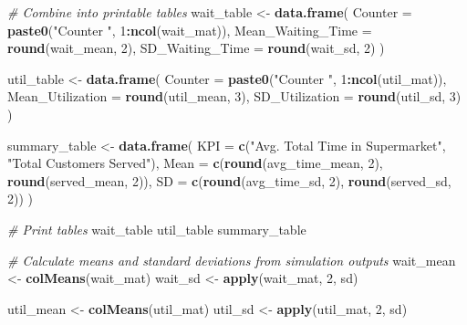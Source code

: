 \documentclass[
]{article}
\newenvironment{Shaded}{\begin{snugshade}}{\end{snugshade}}
\newcommand{\AttributeTok}[1]{\textcolor[rgb]{0.13,0.29,0.53}{#1}}
\newcommand{\CommentTok}[1]{\textcolor[rgb]{0.56,0.35,0.01}{\textit{#1}}}
\newcommand{\DecValTok}[1]{\textcolor[rgb]{0.00,0.00,0.81}{#1}}
\newcommand{\FunctionTok}[1]{\textcolor[rgb]{0.13,0.29,0.53}{\textbf{#1}}}
\newcommand{\NormalTok}[1]{#1}
\newcommand{\OtherTok}[1]{\textcolor[rgb]{0.56,0.35,0.01}{#1}}
\newcommand{\SpecialCharTok}[1]{\textcolor[rgb]{0.81,0.36,0.00}{\textbf{#1}}}
\newcommand{\StringTok}[1]{\textcolor[rgb]{0.31,0.60,0.02}{#1}}
\begin{document}
\begin{Shaded}
\begin{Highlighting}[]
\CommentTok{\# Combine into printable tables}
\NormalTok{wait\_table }\OtherTok{\textless{}{-}} \FunctionTok{data.frame}\NormalTok{(}
  \AttributeTok{Counter =} \FunctionTok{paste0}\NormalTok{(}\StringTok{"Counter "}\NormalTok{, }\DecValTok{1}\SpecialCharTok{:}\FunctionTok{ncol}\NormalTok{(wait\_mat)),}
  \AttributeTok{Mean\_Waiting\_Time =} \FunctionTok{round}\NormalTok{(wait\_mean, }\DecValTok{2}\NormalTok{),}
  \AttributeTok{SD\_Waiting\_Time =} \FunctionTok{round}\NormalTok{(wait\_sd, }\DecValTok{2}\NormalTok{)}
\NormalTok{)}

\NormalTok{util\_table }\OtherTok{\textless{}{-}} \FunctionTok{data.frame}\NormalTok{(}
  \AttributeTok{Counter =} \FunctionTok{paste0}\NormalTok{(}\StringTok{"Counter "}\NormalTok{, }\DecValTok{1}\SpecialCharTok{:}\FunctionTok{ncol}\NormalTok{(util\_mat)),}
  \AttributeTok{Mean\_Utilization =} \FunctionTok{round}\NormalTok{(util\_mean, }\DecValTok{3}\NormalTok{),}
  \AttributeTok{SD\_Utilization =} \FunctionTok{round}\NormalTok{(util\_sd, }\DecValTok{3}\NormalTok{)}
\NormalTok{)}

\NormalTok{summary\_table }\OtherTok{\textless{}{-}} \FunctionTok{data.frame}\NormalTok{(}
  \AttributeTok{KPI =} \FunctionTok{c}\NormalTok{(}\StringTok{"Avg. Total Time in Supermarket"}\NormalTok{, }\StringTok{"Total Customers Served"}\NormalTok{),}
  \AttributeTok{Mean =} \FunctionTok{c}\NormalTok{(}\FunctionTok{round}\NormalTok{(avg\_time\_mean, }\DecValTok{2}\NormalTok{), }\FunctionTok{round}\NormalTok{(served\_mean, }\DecValTok{2}\NormalTok{)),}
  \AttributeTok{SD =} \FunctionTok{c}\NormalTok{(}\FunctionTok{round}\NormalTok{(avg\_time\_sd, }\DecValTok{2}\NormalTok{), }\FunctionTok{round}\NormalTok{(served\_sd, }\DecValTok{2}\NormalTok{))}
\NormalTok{)}

\CommentTok{\# Print tables}
\NormalTok{wait\_table}
\NormalTok{util\_table}
\NormalTok{summary\_table}


\CommentTok{\# Calculate means and standard deviations from simulation outputs}
\NormalTok{wait\_mean }\OtherTok{\textless{}{-}} \FunctionTok{colMeans}\NormalTok{(wait\_mat)}
\NormalTok{wait\_sd }\OtherTok{\textless{}{-}} \FunctionTok{apply}\NormalTok{(wait\_mat, }\DecValTok{2}\NormalTok{, sd)}

\NormalTok{util\_mean }\OtherTok{\textless{}{-}} \FunctionTok{colMeans}\NormalTok{(util\_mat)}
\NormalTok{util\_sd }\OtherTok{\textless{}{-}} \FunctionTok{apply}\NormalTok{(util\_mat, }\DecValTok{2}\NormalTok{, sd)}


\end{Highlighting}
\end{Shaded}
\end{document}

